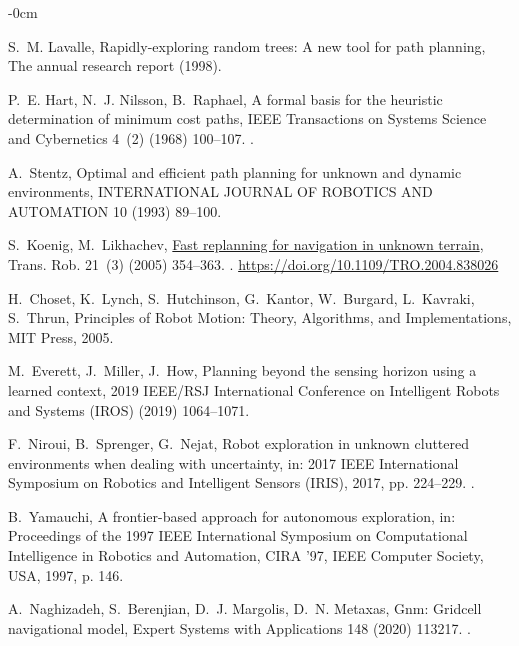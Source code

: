 \documentclass[journal,article,submit,pdftex,moreauthors]{Definitions/mdpi}
\begin{document}
\begin{adjustwidth}{-\extralength}{0cm}
\begin{thebibliography}{10}
	S.~M. Lavalle, Rapidly-exploring random trees: A new tool for path planning,
	  The annual research report (1998).
	
	P.~E. Hart, N.~J. Nilsson, B.~Raphael, A formal basis for the heuristic
	  determination of minimum cost paths, IEEE Transactions on Systems Science and
	  Cybernetics 4~(2) (1968) 100--107.
	\newblock \href {https://doi.org/10.1109/TSSC.1968.300136}
	  {}.
	
	A.~Stentz, Optimal and efficient path planning for unknown and dynamic
	  environments, INTERNATIONAL JOURNAL OF ROBOTICS AND AUTOMATION 10 (1993)
	  89--100.
	
	S.~Koenig, M.~Likhachev, \href{https://doi.org/10.1109/TRO.2004.838026}{Fast
	  replanning for navigation in unknown terrain}, Trans. Rob. 21~(3) (2005)
	  354–363.
	\newblock \href {https://doi.org/10.1109/TRO.2004.838026}
	  {}.
	\newline\urlprefix\url{https://doi.org/10.1109/TRO.2004.838026}
	
	H.~Choset, K.~Lynch, S.~Hutchinson, G.~Kantor, W.~Burgard, L.~Kavraki,
	  S.~Thrun, Principles of Robot Motion: Theory, Algorithms, and
	  Implementations, MIT Press, 2005.
	
	M.~Everett, J.~Miller, J.~How, Planning beyond the sensing horizon using a
	  learned context, 2019 IEEE/RSJ International Conference on Intelligent Robots
	  and Systems (IROS) (2019) 1064--1071.
	
	F.~Niroui, B.~Sprenger, G.~Nejat, Robot exploration in unknown cluttered
	  environments when dealing with uncertainty, in: 2017 IEEE International
	  Symposium on Robotics and Intelligent Sensors (IRIS), 2017, pp. 224--229.
	\newblock \href {https://doi.org/10.1109/IRIS.2017.8250126}
	  {}.
	
	B.~Yamauchi, A frontier-based approach for autonomous exploration, in:
	  Proceedings of the 1997 IEEE International Symposium on Computational
	  Intelligence in Robotics and Automation, CIRA '97, IEEE Computer Society,
	  USA, 1997, p. 146.
	
	A.~Naghizadeh, S.~Berenjian, D.~J. Margolis, D.~N. Metaxas, Gnm: Gridcell
	  navigational model, Expert Systems with Applications 148 (2020) 113217.
	\newblock \href {https://doi.org/https://doi.org/10.1016/j.eswa.2020.113217}
	  {}.
	

\end{thebibliography}
\end{adjustwidth}
\end{document}
